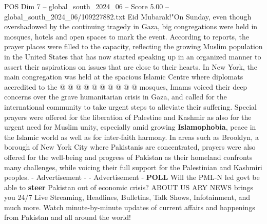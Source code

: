 \begin{textsample}{POS Dim 7 – global\_south\_2024\_06 – Score 5.00 – global\_south\_2024\_06/109227882.txt}
Eid Mubarak!"On Sunday, even though overshadowed by the continuing tragedy in Gaza, big congregations were held in mosques, hotels and open spaces to mark the event.
According to reports, the prayer places were filled to the capacity, reflecting the growing Muslim population in the United States that has now started speaking up in an organized manner to assert their aspirations on issues that are close to their hearts.
In New York, the main congregation was held at the spacious Islamic Centre where diplomats accredited to the @ @ @ @ @ @ @ @ @ @ mosques, Imams voiced their deep concerns over the grave humanitarian crisis in Gaza, and called for the international community to take urgent steps to alleviate their suffering.
Special prayers were offered for the liberation of Palestine and Kashmir as also for the urgent need for Muslim unity, especially amid growing \textbf{Islamophobia}, peace in the Islamic world as well as for inter-faith harmony.
In areas such as Brooklyn, a borough of New York City where Pakistanis are concentrated, prayers were also offered for the well-being and progress of Pakistan as their homeland confronts many challenges, while voicing their full support for the Palestinian and Kashmiri peoples. - Advertisement - - Advertisement - \textbf{POLL} Will the PML-N led govt be able to \textbf{steer} Pakistan out of economic crisis?
ABOUT US ARY NEWS brings you 24/7 Live Streaming, Headlines, Bulletins, Talk Shows, Infotainment, and much more.
Watch minute-by-minute updates of current affairs and happenings from Pakistan and all around the world!

\end{textsample}
